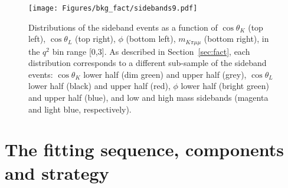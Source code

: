 

\begin{figure}[!hbt]
  \centering
  \texttt{[image: Figures/bkg\_fact/sidebands9.pdf]}
  \caption{Distributions of the sideband events as a function of $\cos\theta_K$ (top left), $\cos\theta_L$ (top right), $\phi$ (bottom left), $m_{K\pi\mu\mu}$ (bottom right), in the $q^2$ bin range [0,3]. As described in Section~\ref{sec:fact}, each distribution corresponds to a different sub-sample of the sideband events: $\cos\theta_K$ lower half (dim green) and upper half (grey), $\cos\theta_L$ lower half (black) and upper half (red), $\phi$ lower half (bright green) and upper half (blue), and low and high mass sidebands (magenta and light blue, respectively).}
  \label{fig:side9}
\end{figure}


\section{The fitting sequence, components and strategy}
\label{sec:fitseq}

